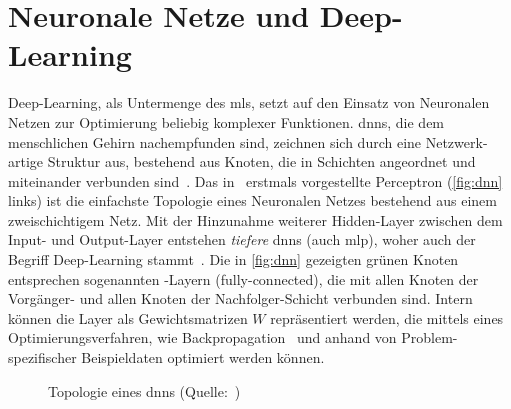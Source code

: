 \section{Neuronale Netze und Deep-Learning}
\label{sec:deep-learning}

Deep-Learning, als Untermenge des \glspl{ml}, setzt auf den Einsatz von Neuronalen Netzen zur Optimierung beliebig komplexer Funktionen.
\glspl{dnn}, die dem menschlichen Gehirn nachempfunden sind, zeichnen sich durch eine Netzwerk-artige Struktur aus, bestehend aus Knoten, die in Schichten angeordnet und miteinander verbunden sind~\cite{Burkov19}.
Das in~\cite{rosenblatt58} erstmals vorgestellte Perceptron (\autoref{fig:dnn} links) ist die einfachste Topologie eines Neuronalen Netzes bestehend aus einem zweischichtigem Netz.
Mit der Hinzunahme weiterer \sog Hidden-Layer zwischen dem Input- und Output-Layer entstehen \emph{tiefere} \glspl{dnn} (auch \gls{mlp}), woher auch der Begriff Deep-Learning stammt~\cite{Burkov19}.
Die in \autoref{fig:dnn} gezeigten grünen Knoten entsprechen sogenannten \fc-Layern (fully-connected), die mit allen Knoten der Vorgänger- und allen Knoten der Nachfolger-Schicht verbunden sind.
Intern können die Layer als Gewichtsmatrizen $W$ repräsentiert werden, die mittels eines Optimierungsverfahren, wie Backpropagation~\cite{rumelhart86} und anhand von Problem-spezifischer Beispieldaten optimiert werden können.

\begin{figure}
    \centering
    \caption[Topologie eines DNNs]{Topologie eines \glspl{dnn} (Quelle:~\cite{Veen17})}
    \label{fig:dnn}
\end{figure}




